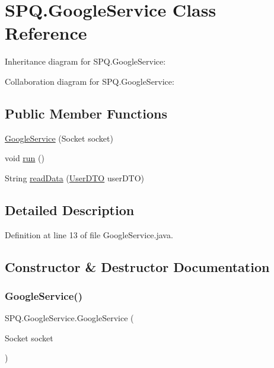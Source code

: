 \hypertarget{class_s_p_q_1_1_google_service}{}\section{S\+P\+Q.\+Google\+Service Class Reference}
\label{class_s_p_q_1_1_google_service}


Inheritance diagram for S\+P\+Q.\+Google\+Service\+:


Collaboration diagram for S\+P\+Q.\+Google\+Service\+:
\subsection*{Public Member Functions}
\begin{DoxyCompactItemize}
\item 
\mbox{\hyperlink{class_s_p_q_1_1_google_service_aa585d2611aa3d84e9cdbc67609207c99}{Google\+Service}} (Socket socket)
\item 
void \mbox{\hyperlink{class_s_p_q_1_1_google_service_aecd41a7e761dc392fc96e096547dc504}{run}} ()
\item 
String \mbox{\hyperlink{class_s_p_q_1_1_google_service_a94e224618cc0433776bcb49bff80067f}{read\+Data}} (\mbox{\hyperlink{class_s_p_q_1_1dto_1_1_user_d_t_o}{User\+D\+TO}} user\+D\+TO)
\end{DoxyCompactItemize}


\subsection{Detailed Description}


Definition at line 13 of file Google\+Service.\+java.



\subsection{Constructor \& Destructor Documentation}
\mbox{\label{class_s_p_q_1_1_google_service_aa585d2611aa3d84e9cdbc67609207c99}} 
\subsubsection{\texorpdfstring{Google\+Service()}{GoogleService()}}
{\footnotesize\ttfamily S\+P\+Q.\+Google\+Service.\+Google\+Service (\begin{DoxyParamCaption}\item[{Socket}]{socket }\end{DoxyParamCaption})}



